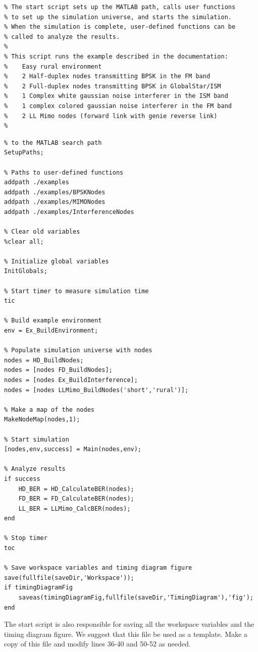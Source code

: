 \begin{lstlisting}[name=startExample]
% Script StartExample.m:
% The start script sets up the MATLAB path, calls user functions 
% to set up the simulation universe, and starts the simulation.  
% When the simulation is complete, user-defined functions can be 
% called to analyze the results.
%
% This script runs the example described in the documentation:
%    Easy rural environment
%    2 Half-duplex nodes transmitting BPSK in the FM band
%    2 Full-duplex nodes transmitting BPSK in GlobalStar/ISM
%    1 Complex white gaussian noise interferer in the ISM band
%    1 complex colored gaussian noise interferer in the FM band
%    2 LL Mimo nodes (forward link with genie reverse link)
%
\end{lstlisting}
\begin{lstlisting}[name=startExample,firstnumber=21]
% Add required directories containing simulator functions 
% to the MATLAB search path
SetupPaths;

% Paths to user-defined functions
addpath ./examples
addpath ./examples/BPSKNodes
addpath ./examples/MIMONodes
addpath ./examples/InterferenceNodes

% Clear old variables
%clear all;

% Initialize global variables
InitGlobals;

% Start timer to measure simulation time
tic

% Build example environment
env = Ex_BuildEnvironment;

% Populate simulation universe with nodes
nodes = HD_BuildNodes;
nodes = [nodes FD_BuildNodes];
nodes = [nodes Ex_BuildInterference];
nodes = [nodes LLMimo_BuildNodes('short','rural')];

% Make a map of the nodes
MakeNodeMap(nodes,1);

% Start simulation
[nodes,env,success] = Main(nodes,env);

% Analyze results
if success
    HD_BER = HD_CalculateBER(nodes);
    FD_BER = FD_CalculateBER(nodes);
    LL_BER = LLMimo_CalcBER(nodes);
end

% Stop timer
toc

% Save workspace variables and timing diagram figure
save(fullfile(saveDir,'Workspace'));
if timingDiagramFig
    saveas(timingDiagramFig,fullfile(saveDir,'TimingDiagram'),'fig');
end
\end{lstlisting}

The start script is also responsible for saving all the workspace
variables and the timing diagram figure.  We suggest that this file
be used as a template.  Make a copy of this file and modify lines
36-40 and 50-52 as needed.

